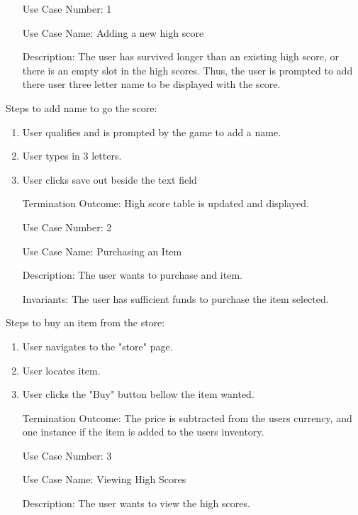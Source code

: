 \documentclass[10pt,conference,onecolumn,compsoc]{IEEEtran}
\begin{document}
\begin{itemize}
\item[Use Case Number:] 1
\item[Use Case Name:] Adding a new high score
\item[Description:] The user has survived longer than an existing high score, or there is an empty slot in the high scores. Thus, the user is prompted to add there user three letter name to be displayed with the score.\end{itemize}

Steps to add name to go the score:

\begin{enumerate}
\item User qualifies and is prompted by the game to add a name.
\item User types in 3 letters.
\item User clicks save out beside the text field
\item[Termination Outcome:] High score table is updated and displayed.\\
\end{enumerate}

\begin{itemize}
\item[Use Case Number:] 2
\item[Use Case Name:] Purchasing an Item
\item[Description:] The user wants to purchase and item.
\item[Invariants:] The user has sufficient funds to purchase the item selected.
\end{itemize}

Steps to buy an item from the store:

\begin{enumerate}
\item User navigates to the "store" page.
\item User locates item.
\item User clicks the "Buy" button bellow the item wanted.
\item[Termination Outcome:] The price is subtracted from the users currency, and one instance if the 
item is added to the users inventory.\\
\end{enumerate}

\begin{itemize}
\item[Use Case Number:] 3
\item[Use Case Name:] Viewing High Scores
\item[Description:] The user wants to view the high scores.
\end{itemize}
\end{document}
